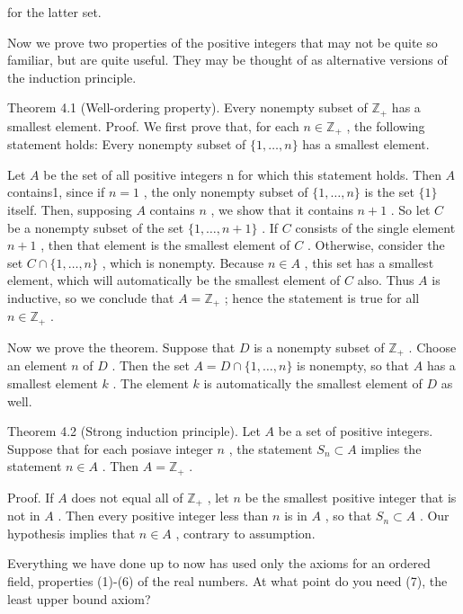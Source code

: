 for the latter set.

Now we prove two properties of the positive integers that may not be quite so familiar, but are quite useful. They may be thought of as alternative versions of the induction principle.

Theorem 4.1 (Well-ordering property). Every nonempty subset of \({\mathbb{Z}}_{ + }\) has a smallest element. Proof. We first prove that, for each \(n \in  {\mathbb{Z}}_{ + }\) , the following statement holds: Every nonempty subset of \(\{ 1,\ldots ,n\}\) has a smallest element.

Let \(A\) be the set of all positive integers \(\mathrm{n}\) for which this statement holds. Then \(A\) contains1, since if \(n = 1\) , the only nonempty subset of \(\{ 1,\ldots ,n\}\) is the set \(\{ 1\}\) itself. Then, supposing \(A\) contains \(n\) , we show that it contains \(n + 1\) . So let \(C\) be a nonempty subset of the set \(\{ 1,\ldots ,n + 1\}\) . If \(C\) consists of the single element \(n + 1\) , then that element is the smallest element of \(C\) . Otherwise, consider the set \(C \cap  \{ 1,\ldots ,n\}\) , which is nonempty. Because \(n \in  A\) , this set has a smallest element, which will automatically be the smallest element of \(C\) also. Thus \(A\) is inductive, so we conclude that \(A = {\mathbb{Z}}_{ + }\) ; hence the statement is true for all \(n \in  {\mathbb{Z}}_{ + }\) .

Now we prove the theorem. Suppose that \(D\) is a nonempty subset of \({\mathbb{Z}}_{ + }\) . Choose an element \(n\) of \(D\) . Then the set \(A = D \cap  \{ 1,\ldots ,n\}\) is nonempty, so that \(A\) has a smallest element \(k\) . The element \(k\) is automatically the smallest element of \(D\) as well.

Theorem 4.2 (Strong induction principle). Let \(A\) be a set of positive integers. Suppose that for each posiave integer \(n\) , the statement \({S}_{n} \subset  A\) implies the statement \(n \in  A\) . Then \(A = {\mathbb{Z}}_{ + }\) .

Proof. If \(A\) does not equal all of \({\mathbb{Z}}_{ + }\) , let \(n\) be the smallest positive integer that is not in \(A\) . Then every positive integer less than \(n\) is in \(A\) , so that \({S}_{n} \subset  A\) . Our hypothesis implies that \(n \in  A\) , contrary to assumption.

Everything we have done up to now has used only the axioms for an ordered field, properties (1)-(6) of the real numbers. At what point do you need (7), the least upper bound axiom?

